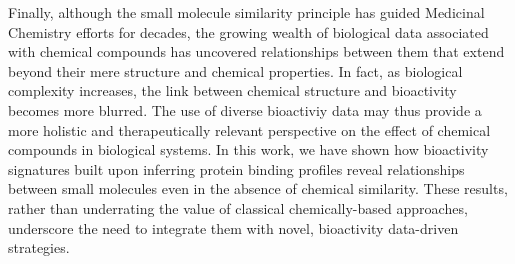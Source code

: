 Finally, although the small molecule similarity principle has guided Medicinal Chemistry efforts for decades, the growing wealth of biological data associated with chemical compounds has uncovered relationships between them that extend beyond their mere structure and chemical properties. In fact, as biological complexity increases, the link between chemical structure and bioactivity becomes more blurred. The use of diverse bioactiviy data may thus provide a more holistic and therapeutically relevant perspective on the effect of chemical compounds in biological systems. In this work, we have shown how bioactivity signatures built upon inferring protein binding profiles reveal relationships between small molecules even in the absence of chemical similarity. These results, rather than underrating the value of classical chemically-based approaches, underscore the need to integrate them with novel, bioactivity data-driven strategies. 





